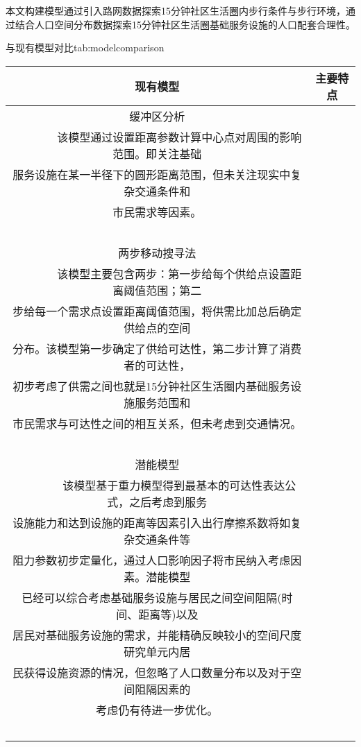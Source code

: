 \documentclass{shnuthesis}
\begin{document}
本文构建模型通过引入路网数据探索15分钟社区生活圈内步行条件与步行环境，通过结合人口空间分布数据探索15分钟社区生活圈基础服务设施的人口配套合理性。

\vspace{1em}
\begin{generaltab}[htb]{与现有模型对比}{tab:modelcomparison}
	\begin{tabularx}{1\textwidth}{cl}
		\toprule[1.5pt]
		现有模型    & \multicolumn{1}{c}{主要特点}                                                                                                                                                                                                                               \\
		\midrule
		缓冲区分析\textsuperscript{\cite{zhao2009a}}   & \begin{tabular}[c]{@{}l@{}}~\\~~~~~~~~该模型通过设置距离参数计算中心点对周围的影响范围。即关注基础\\ 服务设施在某一半径下的圆形距离范围，但未关注现实中复杂交通条件和\\ 市民需求等因素。\\~\end{tabular}                                                                                                                                                 \\
		两步移动搜寻法\textsuperscript{\cite{yu2012a}} & \begin{tabular}[c]{@{}l@{}}~\\~~~~~~~~该模型主要包含两步：第一步给每个供给点设置距离阈值范围；第二\\ 步给每一个需求点设置距离阈值范围，将供需比加总后确定供给点的空间\\ 分布。该模型第一步确定了供给可达性，第二步计算了消费者的可达性，\\ 初步考虑了供需之间也就是15分钟社区生活圈内基础服务设施服务范围和\\ 市民需求与可达性之间的相互关系，但未考虑到交通情况。\\~\end{tabular}                                                        \\
		潜能模型\textsuperscript{\cite{cheng2018b,tang2017}}    & \begin{tabular}[c]{@{}l@{}}~\\~~~~~~~~该模型基于重力模型得到最基本的可达性表达公式，之后考虑到服务\\ 设施能力和达到设施的距离等因素引入出行摩擦系数将如复杂交通条件等\\ 阻力参数初步定量化，通过人口影响因子将市民纳入考虑因素。潜能模型\\ 已经可以综合考虑基础服务设施与居民之间空间阻隔(时间、距离等)以及\\ 居民对基础服务设施的需求，并能精确反映较小的空间尺度研究单元内居\\ 民获得设施资源的情况，但忽略了人口数量分布以及对于空间阻隔因素的\\ 考虑仍有待进一步优化。\\~\end{tabular}\\

\end{tabularx}
\end{generaltab}
\end{document}
